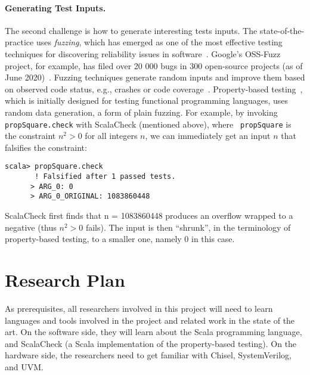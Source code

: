 \documentclass[fleqn,12pt]{article}
\begin{document}
\paragraph{Generating Test Inputs.}
The second challenge is how to generate interesting tests inputs.  The
state-of-the-practice uses \emph{fuzzing}, which has emerged as one of
the most effective testing techniques for discovering reliability
issues in software~\cite{takanen2018fuzzing}.  Google's OSS-Fuzz
project, for example, has filed over 20 000 bugs in 300 open-source
projects (as of June 2020)~\cite{web:oss-fuzz}.  Fuzzing techniques
generate random inputs and improve them based on observed code status,
e.g., crashes or code
coverage~\cite{DBLP:journals/tse/BohmePR19,DBLP:conf/pldi/FuS17}.
Property-based testing~\cite{DBLP:conf/icfp/ClaessenH00}, which is
initially designed for testing functional programming languages, uses
random data generation, a form of plain fuzzing. For example, by
invoking {\tt propSquare.check} with ScalaCheck (mentioned above), where {\tt
  propSquare} is the constraint $n^2>0$ for all integers $n$, we can
immediately get an input $n$ that falsifies the constraint:

\begin{lstlisting}[numbers=none]
scala> propSquare.check
       ! Falsified after 1 passed tests.
      > ARG_0: 0
      > ARG_0_ORIGINAL: 1083860448
\end{lstlisting}
 ScalaCheck first finds that n = 1083860448 produces an overflow
 wrapped to a negative (thus $n^2>0$ fails). The input is then
 ``shrunk'', in the terminology of property-based testing, to a smaller
 one, namely 0 in this case.







\section{Research Plan}


As prerequisites, all researchers involved in this project will need to learn
languages and tools involved in the project and related work in the state of
the art. On the software side, they will learn about the 
Scala programming language, and ScalaCheck (a Scala implementation of
the property-based testing). On the hardware side,
the researchers need to get familiar with Chisel, SystemVerilog, and
UVM.
\end{document}
